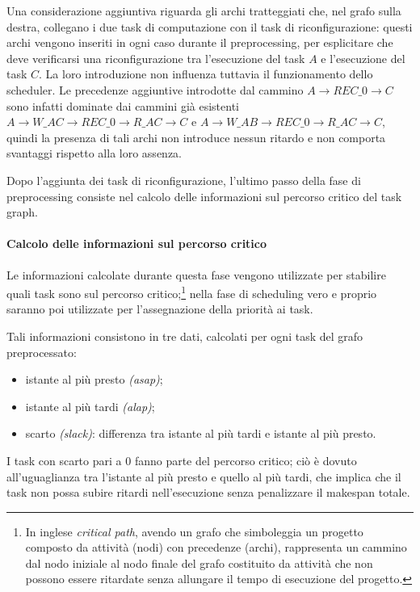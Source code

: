 Una considerazione 
aggiuntiva riguarda gli archi tratteggiati che, nel grafo sulla destra, 
collegano i due task di computazione con il task di riconfigurazione: questi 
archi vengono inseriti in ogni caso durante il preprocessing, per esplicitare 
che deve verificarsi una riconfigurazione tra l'esecuzione del task $A$ e 
l'esecuzione del task $C$. La loro introduzione non influenza tuttavia il 
funzionamento dello scheduler. Le precedenze aggiuntive introdotte dal cammino 
$A \rightarrow REC\_0 \rightarrow C$ sono infatti dominate dai cammini già 
esistenti $A \rightarrow W\_AC \rightarrow REC\_0 \rightarrow R\_AC \rightarrow 
C$ e $A \rightarrow W\_AB \rightarrow REC\_0 \rightarrow R\_AC \rightarrow C$, 
quindi la presenza di tali archi non introduce nessun ritardo e non comporta 
svantaggi rispetto alla loro assenza.

Dopo l'aggiunta dei task di riconfigurazione, l'ultimo passo della fase di 
preprocessing consiste nel calcolo delle informazioni sul percorso critico del 
task graph.


\paragraph{Calcolo delle informazioni sul percorso critico}
\label{par:percorsoCritico}
Le informazioni calcolate durante questa fase vengono utilizzate per stabilire 
quali task sono sul percorso critico;\footnote{In inglese \emph{critical path}, 
avendo un grafo che simboleggia un progetto composto da attività (nodi) con 
precedenze (archi), rappresenta un cammino dal nodo iniziale al nodo finale del 
grafo costituito da attività che non possono essere ritardate senza allungare 
il tempo di esecuzione del progetto.} nella fase di scheduling vero e proprio
saranno poi utilizzate per l'assegnazione della priorità ai task.

Tali informazioni consistono in tre dati, calcolati per ogni task del grafo 
preprocessato:
\begin{itemize}
 \item istante al più presto \emph{(asap)};
 \item istante al più tardi \emph{(alap)};
 \item scarto \emph{(slack)}: differenza tra istante al più tardi e istante al 
più presto.
\end{itemize}
I task con scarto pari a $0$ fanno parte del percorso critico; ci\`o \`e dovuto
all'uguaglianza tra l'istante al pi\`u presto e quello al pi\`u tardi, che implica che
il task non possa subire ritardi nell'esecuzione senza penalizzare il makespan totale.

